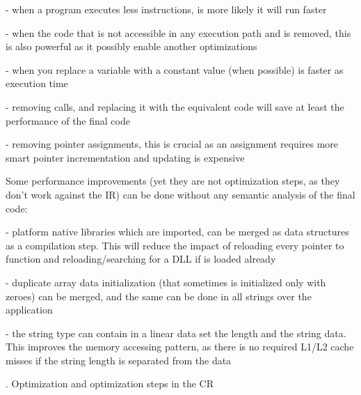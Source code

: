 \documentclass[letterpaper]{article}
\begin{document}
{}- when a program executes less instructions, is more likely it will run faster

{}- when the code that is not accessible in any execution path and is removed, this is also powerful as it possibly
enable another optimizations

{}- when you replace a variable with a constant value (when possible) is faster as execution time

{}- removing calls, and replacing it with the equivalent code will save at least the performance of the final code

{}- removing pointer assignments, this is crucial as an assignment requires more smart pointer incrementation and
updating is expensive


\bigskip

Some performance improvements (yet they are not optimization steps, as they don't work against the IR) can be done
without any semantic analysis of the final code:

{}- platform native libraries which are imported, can be merged as data structures as a compilation step. This will
reduce the impact of reloading every pointer to function and reloading/searching for a DLL if is loaded already

{}- duplicate array data initialization (that sometimes is initialized only with zeroes) can be merged, and the same can
be done in all strings over the application

{}- the string type can contain in a linear data set the length and the string data. This improves the memory accessing
pattern, as there is no required L1/L2 cache misses if the string length is separated from the data


\bigskip

. Optimization and optimization steps in the CR


\bigskip
\end{document}
